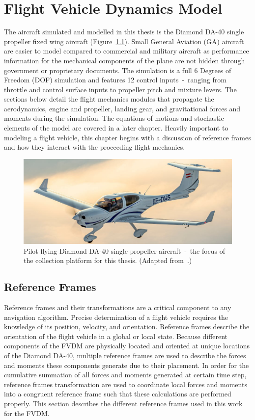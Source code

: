 \chapter{Flight Vehicle Dynamics Model}
The aircraft simulated and modelled in this thesis is the Diamond DA-40 single propeller fixed wing aircraft (Figure~\ref{fig:DA40}). Small General Aviation (GA) aircraft are easier to model compared to commercial and military aircraft as performance information for the mechanical components of the plane are not hidden through government or proprietary documents. The simulation is a full 6 Degrees of Freedom (DOF) simulation and features 12 control inputs~-~ranging from throttle and control surface inputs to propeller pitch and mixture levers. The sections below detail the flight mechanics modules that propagate the aerodynamics, engine and propeller, landing gear, and gravitational forces and moments during the simulation. The equations of motions and stochastic elements of the model are covered in a later chapter. Heavily important to modeling a flight vehicle, this chapter begins with a discussion of reference frames and how they interact with the proceeding flight mechanics.

\begin{figure}[!ht]\label{fig:DA40}
    \centering
    \includegraphics[width=.85\linewidth]{Figures/DA40.jpg}
    \caption{Pilot flying Diamond DA-40 single propeller aircraft~-~the focus of the collection platform for this thesis. (Adapted from~\cite{DiamondAircraftDA40}.)}
\end{figure}

\section{Reference Frames}
Reference frames and their transformations are a critical component to any navigation algorithm. Precise determination of a flight vehicle requires the knowledge of its position, velocity, and orientation. Reference frames describe the orientation of the flight vehicle in a global or local state. Because different components of the FVDM are physically located and oriented at unique locations of the Diamond DA-40, multiple reference frames are used to describe the forces and moments these components generate due to their placement. In order for the cumulative summation of all forces and moments generated at certain time step, reference frames transformation are used to coordinate local forces and moments into a congruent reference frame such that these calculations are performed properly. This section describes the different reference frames used in this work for the FVDM\@.

